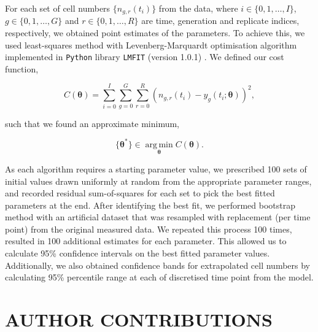 \documentclass[11pt, a4paper]{article}
\begin{document}
For each set of cell numbers $\{n_{g,r}(t_i)\}$ from the data, where $i \in \{0, 1, \dots, I\}$, $g \in \{0, 1, \dots, G\}$ and $r \in \{0,1,\dots,R\}$ are time, generation and replicate indices, respectively, we obtained point estimates of the parameters. 
To achieve this, we used least-squares method with Levenberg-Marquardt \parencite{Marquardt.1963} optimisation algorithm implemented in \verb+Python+ library \verb+LMFIT+ (version 1.0.1) \parencite{Newville.2014}. We defined our cost function, 
\begin{linenomath*}
    \begin{equation*}
        C(\boldsymbol{\theta}) = \sum_{i=0}^I \sum_{g=0}^G \sum_{r=0}^{R} \left( n_{g,r}(t_i) - y_g(t_i; \boldsymbol{\theta}) \right)^2,
    \end{equation*}
\end{linenomath*}
such that we found an approximate minimum,
\begin{linenomath*}
    \begin{equation*}
        \{\boldsymbol{\theta}^*\} \in \operatorname*{arg\,min}_{\boldsymbol{\theta}} C(\boldsymbol{\theta}).
    \end{equation*}
\end{linenomath*}
As each algorithm requires a starting parameter value, we prescribed 100 sets of initial values drawn uniformly at random from the appropriate parameter ranges, and recorded residual sum-of-squares for each set to pick the best fitted parameters at the end. After identifying the best fit, we performed bootstrap method \parencite{Efron.1979} with an artificial dataset that was resampled with replacement (per time point) from the original measured data. We repeated this process 100 times, resulted in 100 additional estimates for each parameter. This allowed us to calculate 95\% confidence intervals on the best fitted parameter values. Additionally, we also obtained confidence bands for extrapolated cell numbers by calculating 95\% percentile range at each of discretised time point from the model.

\nolinenumbers
\section*{AUTHOR CONTRIBUTIONS}
\linenumbers
\end{document}
